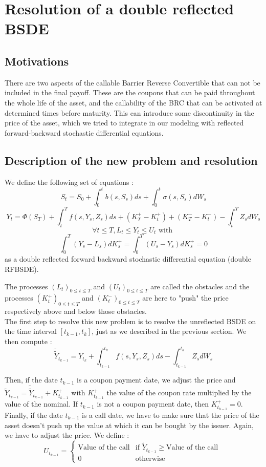 \documentclass[a4paper,11pt,english]{book}
\begin{document}
\section{Resolution of a double reflected BSDE}
\subsection{Motivations}
There are two aspects of the callable Barrier Reverse Convertible that can not be included in the final payoff. These are the coupons that can be paid throughout the whole life of the asset, and the callability of the BRC that can be activated at determined times before maturity. This can introduce some discontinuity in the price of the asset, which we tried to integrate in our modeling with reflected forward-backward stochastic differential equations.
\subsection{Description of the new problem and resolution}
We define the following set of equations :
$$S_{t}=S_{0} + \int_{0}^{t}b(s,S_{s})ds + \int_{0}^{t}\sigma(s,S_{s})dW_{s}$$
$$Y_{t}=\Phi(S_{T})+\int_{t}^{T}f(s,Y_{s},Z_{s})ds+(K_{T}^{+}-K_{t}^{+})+(K_{T}^{-}-K_{t}^{-})-\int_{t}^{T}Z_{s}dW_{s}$$
$$\forall t\leq T, L_{t}\leq Y_{t}\leq U_{t} \text{ with }$$ $$\int_{0}^{T}(Y_{s}-L_{s})dK_{s}^{+}=\int_{0}^{T}(U_{s}-Y_{s})dK_{s}^{+}=0$$
as a double reflected forward backward stochastic differential equation (double RFBSDE).

The processes $(L_{t})_{0\leq t \leq T}$ and $(U_{t})_{0\leq t \leq T}$ are called the obstacles and the processes $(K_{t}^{+})_{0\leq t \leq T}$ and $(K_{t}^{-})_{0\leq t \leq T}$ are here to "push" the price respectively above and below those obstacles. \\

The first step to resolve this new problem is to resolve the unreflected BSDE on the time interval $[t_{k-1},t_{k}]$, just as we described in the previous section. We then compute : $$\widetilde{\widetilde{Y}}_{t_{k-1}}=Y_{t_{k}}+\int_{t_{k-1}}^{t_{k}}f(s,Y_{s},Z_{s})ds-\int_{t_{k-1}}^{t_{k}}Z_{s}dW_{s}$$

Then, if the date $t_{k-1}$ is a coupon payment date, we adjust the price and $\widetilde{Y}_{t_{k-1}}= \widetilde{\widetilde{Y}}_{t_{k-1}} + K_{t_{k-1}}^{+}$ with $K_{t_{k-1}}^{+}$ the value of the coupon rate multiplied by the value of the nominal. If $t_{k-1}$ is not a coupon payment date, then $K_{t_{k-1}}^{+}=0$. \\
Finally, if the date $t_{k-1}$ is a call date, we have to make sure that the price of the asset doesn't push up the value at which it can be bought by the issuer. Again, we have to adjust the price. We define :
$$U_{t_{k-1}}=
\begin{cases}
\text{Value of the call} & \text{if } \widetilde{Y}_{t_{k-1}}\geq \text{Value of the call }\\
0& \text{otherwise }
\end{cases}$$
\end{document}
